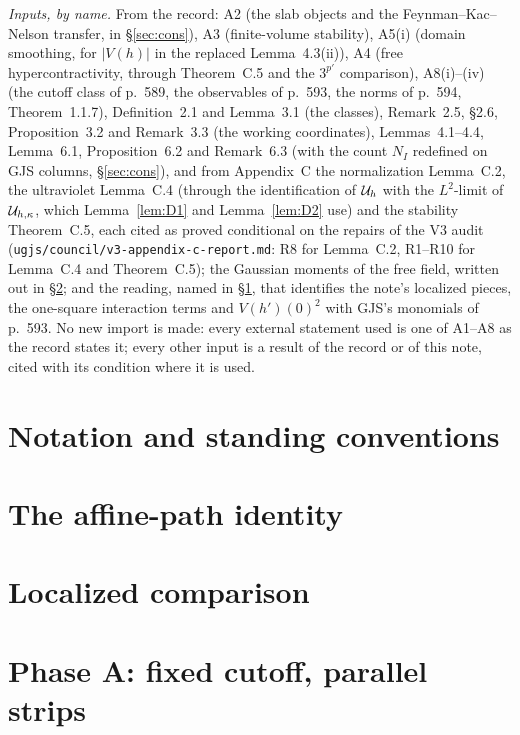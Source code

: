 \emph{Inputs, by name.} From the record: A2 (the slab objects and the Feynman--Kac--Nelson
transfer, in \S\ref{sec:cons}), A3 (finite-volume stability), A5(i) (domain smoothing, for
$|V(h)|$ in the replaced Lemma~4.3(ii)), A4 (free hypercontractivity,
through Theorem~C.5 and the $3^{p'}$ comparison), A8(i)--(iv) (the cutoff class of p.~589, the
observables of p.~593, the norms of p.~594, Theorem~1.1.7), Definition~2.1 and Lemma~3.1 (the classes), Remark~2.5, \S2.6,
Proposition~3.2 and Remark~3.3 (the working coordinates), Lemmas~4.1--4.4, Lemma~6.1, Proposition~6.2 and Remark~6.3 (with the count $N_I$
redefined on GJS columns, \S\ref{sec:cons}), and from Appendix~C the normalization
Lemma~C.2, the ultraviolet Lemma~C.4 (through the identification of $\mathcal U_h$ with the
$L^2$-limit of $\mathcal U_{h,\kappa}$, which Lemma~\ref{lem:D1} and Lemma~\ref{lem:D2} use) and the
stability Theorem~C.5, each cited as proved conditional on the repairs of the V3 audit
(\texttt{ugjs/council/v3-appendix-c-report.md}: R8 for Lemma~C.2, R1--R10 for Lemma~C.4 and
Theorem~C.5); the Gaussian moments of the free field, written out in \S\ref{sec:d1}; and the
reading, named in \S\ref{sec:notation}, that identifies the note's localized pieces, the
one-square interaction terms and $V(h')(0)^2$ with GJS's monomials of p.~593. No new import is
made: every external statement used is one of A1--A8 as the record states it; every other
input is a result of the record or of this note, cited with its condition where it is used.

\section{Notation and standing conventions}\label{sec:notation}


\section{The affine-path identity}\label{sec:d1}


\section{Localized comparison}\label{sec:d2}


\section{Phase A: fixed cutoff, parallel strips}\label{sec:d3}



